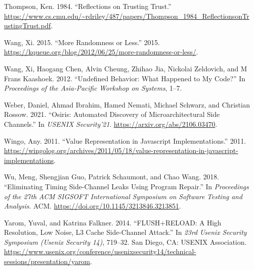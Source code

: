 \documentclass[a4paper,]{report}
\begin{document}
\leavevmode\hypertarget{ref-Thompson1984}{}%
Thompson, Ken. 1984. ``Reflections on Trusting Trust.''
\url{https://www.cs.cmu.edu/~rdriley/487/papers/Thompson_1984_ReflectionsonTrustingTrust.pdf}.

\leavevmode\hypertarget{ref-Wang2015}{}%
Wang, Xi. 2015. ``More Randomness or Less.'' 2015.
\url{https://kqueue.org/blog/2012/06/25/more-randomness-or-less/}.

\leavevmode\hypertarget{ref-wang2012undefined}{}%
Wang, Xi, Haogang Chen, Alvin Cheung, Zhihao Jia, Nickolai Zeldovich,
and M Frans Kaashoek. 2012. ``Undefined Behavior: What Happened to My
Code?'' In \emph{Proceedings of the Asia-Pacific Workshop on Systems},
1--7.

\leavevmode\hypertarget{ref-Weber2021}{}%
Weber, Daniel, Ahmad Ibrahim, Hamed Nemati, Michael Schwarz, and
Christian Rossow. 2021. ``Osiris: Automated Discovery of
Microarchitectural Side Channels.'' In \emph{USENIX Security'21}.
\url{https://arxiv.org/abs/2106.03470}.

\leavevmode\hypertarget{ref-Wingo2011}{}%
Wingo, Any. 2011. ``Value Representation in Javascript
Implementations.'' 2011.
\url{https://wingolog.org/archives/2011/05/18/value-representation-in-javascript-implementations}.

\leavevmode\hypertarget{ref-Wu2018}{}%
Wu, Meng, Shengjian Guo, Patrick Schaumont, and Chao Wang. 2018.
``Eliminating Timing Side-Channel Leaks Using Program Repair.'' In
\emph{Proceedings of the 27th ACM SIGSOFT International Symposium on
Software Testing and Analysis}. ACM.
\url{https://doi.org/10.1145/3213846.3213851}.

\leavevmode\hypertarget{ref-Yarom2014}{}%
Yarom, Yuval, and Katrina Falkner. 2014. ``FLUSH+RELOAD: A High
Resolution, Low Noise, L3 Cache Side-Channel Attack.'' In \emph{23rd
Usenix Security Symposium (Usenix Security 14)}, 719--32. San Diego, CA:
USENIX Association.
\url{https://www.usenix.org/conference/usenixsecurity14/technical-sessions/presentation/yarom}.
\end{document}
